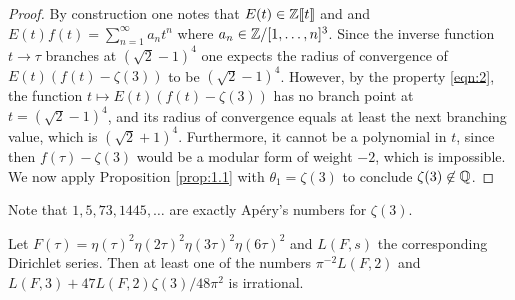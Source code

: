 \begin{proof}
    By construction one notes that $E(t) \in \mathbb{Z}\llbracket t\rrbracket$ and  and $E(t) f(t) = \sum_{n=1}^{\infty} a_n t^n$ where $a_n \in \mathbb{Z} / [1, \dots, n]^3$.
    Since the inverse function $t \to \tau$ branches at $(\sqrt{2} - 1)^{4}$ one expects the radius of convergence of $E(t)(f(t) - \zeta(3))$ to be $(\sqrt{2} - 1)^{4}$.
    However, by the property \eqref{eqn:2}, the function $t \mapsto E(t) (f(t) - \zeta(3))$ has no branch point at $t = (\sqrt{2} - 1)^4$, and its radius of convergence equals at least the next branching value, which is $(\sqrt{2} + 1)^{4}$.
    Furthermore, it cannot be a polynomial in $t$, since then $f(\tau) - \zeta(3)$ would be a modular form of weight $-2$, which is impossible.
    We now apply Proposition \ref{prop:1.1} with $\theta_1 = \zeta(3)$ to conclude $\zeta(3) \not \in \mathbb{Q}$.
\end{proof}

\begin{remark*}
    Note that $1, 5, 73, 1445, \dots$ are exactly Ap\'ery's numbers for $\zeta(3)$.
\end{remark*}

\begin{theorem}
    \label{thm:2}
    Let $F(\tau)  = \eta(\tau)^{2} \eta(2\tau)^{2} \eta(3\tau)^{2} \eta(6\tau)^2$ and $L(F, s)$ the corresponding Dirichlet series.
    Then at least one of the numbers $\pi^{-2}L(F, 2)$ and $L(F, 3) + 47 L(F, 2) \zeta(3) / 48 \pi^2$ is irrational.
\end{theorem}

